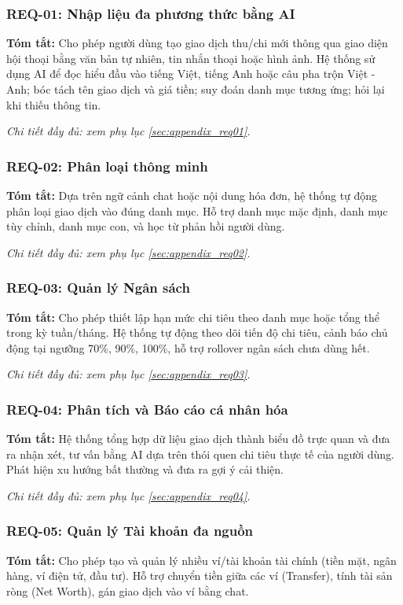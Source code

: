 \subsubsection{REQ-01: Nhập liệu đa phương thức bằng AI}
\textbf{Tóm tắt:} Cho phép người dùng tạo giao dịch thu/chi mới thông qua giao diện hội thoại bằng văn bản tự nhiên, tin nhắn thoại hoặc hình ảnh. Hệ thống sử dụng AI để đọc hiểu đầu vào tiếng Việt, tiếng Anh hoặc câu pha trộn Việt - Anh; bóc tách tên giao dịch và giá tiền; suy đoán danh mục tương ứng; hỏi lại khi thiếu thông tin.

\textit{Chi tiết đầy đủ: xem phụ lục \ref{sec:appendix_req01}.}

\subsubsection{REQ-02: Phân loại thông minh}
\textbf{Tóm tắt:} Dựa trên ngữ cảnh chat hoặc nội dung hóa đơn, hệ thống tự động phân loại giao dịch vào đúng danh mục. Hỗ trợ danh mục mặc định, danh mục tùy chỉnh, danh mục con, và học từ phản hồi người dùng.

\textit{Chi tiết đầy đủ: xem phụ lục \ref{sec:appendix_req02}.}

\subsubsection{REQ-03: Quản lý Ngân sách}
\textbf{Tóm tắt:} Cho phép thiết lập hạn mức chi tiêu theo danh mục hoặc tổng thể trong kỳ tuần/tháng. Hệ thống tự động theo dõi tiến độ chi tiêu, cảnh báo chủ động tại ngưỡng 70\%, 90\%, 100\%, hỗ trợ rollover ngân sách chưa dùng hết.

\textit{Chi tiết đầy đủ: xem phụ lục \ref{sec:appendix_req03}.}

\subsubsection{REQ-04: Phân tích và Báo cáo cá nhân hóa}
\textbf{Tóm tắt:} Hệ thống tổng hợp dữ liệu giao dịch thành biểu đồ trực quan và đưa ra nhận xét, tư vấn bằng AI dựa trên thói quen chi tiêu thực tế của người dùng. Phát hiện xu hướng bất thường và đưa ra gợi ý cải thiện.

\textit{Chi tiết đầy đủ: xem phụ lục \ref{sec:appendix_req04}.}

\subsubsection{REQ-05: Quản lý Tài khoản đa nguồn}
\textbf{Tóm tắt:} Cho phép tạo và quản lý nhiều ví/tài khoản tài chính (tiền mặt, ngân hàng, ví điện tử, đầu tư). Hỗ trợ chuyển tiền giữa các ví (Transfer), tính tài sản ròng (Net Worth), gán giao dịch vào ví bằng chat.

